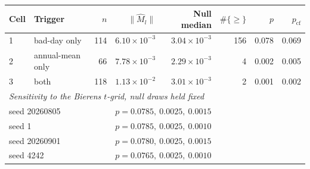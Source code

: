 \begin{tabular}{llrrrrrr}
\toprule
Cell & Trigger & $n$ & $\|\hat M_l\|$ & Null median & $\#\{\ge\}$ & $p$ & $p_{\mathrm{cf}}$ \\
\midrule
1 & bad-day only & 114 & $6.10 \times 10^{-3}$ & $3.04 \times 10^{-3}$ & 156 & 0.078 & 0.069 \\
2 & annual-mean only & 66 & $7.78 \times 10^{-3}$ & $2.29 \times 10^{-3}$ & 4 & 0.002 & 0.005 \\
3 & both & 118 & $1.13 \times 10^{-2}$ & $3.01 \times 10^{-3}$ & 2 & 0.001 & 0.002 \\
\midrule
\multicolumn{8}{l}{\textit{Sensitivity to the Bierens $t$-grid, null draws held fixed}} \\
\multicolumn{3}{l}{seed 20260805} & \multicolumn{5}{l}{$p = 0.0785,\ 0.0025,\ 0.0015$} \\
\multicolumn{3}{l}{seed 1} & \multicolumn{5}{l}{$p = 0.0785,\ 0.0025,\ 0.0010$} \\
\multicolumn{3}{l}{seed 20260901} & \multicolumn{5}{l}{$p = 0.0780,\ 0.0025,\ 0.0015$} \\
\multicolumn{3}{l}{seed 4242} & \multicolumn{5}{l}{$p = 0.0765,\ 0.0025,\ 0.0010$} \\
\bottomrule
\end{tabular}

